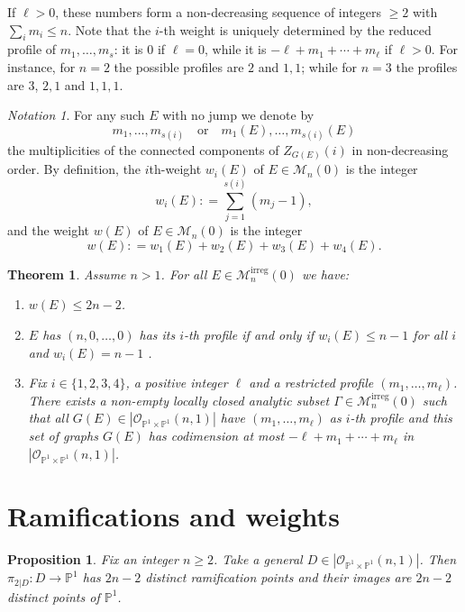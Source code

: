 \documentclass[10pt,a4paper]{amsart}
\theoremstyle{plain}
\newtheorem{theorem}{Theorem}
\newtheorem{proposition}{Proposition}
\theoremstyle{definition}
\theoremstyle{remark}
\newtheorem{notation}{Notation}
\DeclareMathOperator{\irreg}{irreg}
\newcommand{\ce}{\mathrel{\mathop:}=}
\begin{document}
 If $\ell>0$, these numbers form a non-decreasing sequence of integers $\ge 2$ with $\sum _i m_i\le n$. 
 Note that the $i$-th weight is uniquely determined by the reduced profile of $m_1,\dots ,m_s$: it is $0$ if $\ell =0$, while it is $-\ell+m_1+\cdots +m_\ell$ if $\ell>0$.
For instance, for $n=2$ the possible profiles are $2$ and $1,1$; while for $n=3$ the profiles are $3$, $2,1$ and $1,1,1$.\\

\begin{notation}For any such $E$ with no jump we denote by 
$$m_1,\dots ,m_{s(i)} \quad  \text{or} \quad  m_1(E),\dots ,m_{s(i)}(E)$$
 the multiplicities of the connected components of $Z_{G(E)}(i)$ in non-decreasing order. 
By definition, the $i$th-weight $w_i(E)$ of $E\in \mathcal M_n(0)$ is the integer 
 $$w_i(E)\ce \sum _{j=1}^{s(i)} (m_j-1),$$
 and the weight $w(E)$ of $E\in \mathcal M_n(0)$ is the integer $$w(E)\ce w_1(E)+w_2(E)+w_3(E)+w_4(E).$$
\end{notation}

\begin{theorem}\label{Wrr5}
Assume $n>1$. For all $E\in \mathcal M_n^{\irreg}(0)$  we have:
\begin{enumerate}
\item $w(E)\le 2n-2$.
\item $E$ has $(n, 0,\dots, 0)$ has its $i$-th profile if and only if $w_i(E)\le n-1$ for all $i$ and $w_i(E)=n-1$ .
\item Fix $i\in \{1,2,3,4\}$, a positive integer $\ell$ and a restricted profile $(m_1,\dots ,m_\ell)$. 
There exists a non-empty locally closed analytic subset $\Gamma \in \mathcal M_n^{\irreg}(0)$
such that  all  $G(E)\in |\mathcal O_{\mathbb P^1\times \mathbb P^1}(n,1)|$ have   $(m_1,\dots ,m_\ell)$ as $i$-th profile
and this set of graphs $G(E)$  has codimension at most $-\ell +m_1+\cdots +m_\ell$ in $|\mathcal O_{\mathbb P^1\times \mathbb P^1}(n,1)|$.
\end{enumerate}
\end{theorem}

\section{Ramifications and   weights}

\begin{proposition}\label{Wrr6}
Fix an integer $n\ge 2$. Take a general $D\in |\mathcal O_{\mathbb P^1\times \mathbb P^1}(n,1)|$. Then $\pi_{2|D}: D\to \mathbb P^1$ has $2n-2$ distinct ramification points and their images are $2n-2$ distinct points of $\mathbb P^1$.
\end{proposition}
\end{document}
